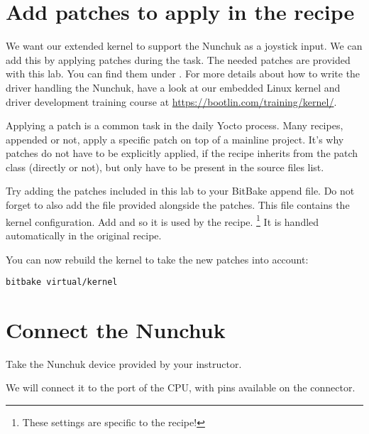 \section{Add patches to apply in the recipe}

We want our extended
{{}}
kernel to support the Nunchuk as
a joystick input. We can add this by applying patches during the
 task. The needed patches are provided with this lab. You can
find them under . For more
details about how to write the driver handling the Nunchuk, have a look at our
embedded Linux kernel and driver development training course at
\url{https://bootlin.com/training/kernel/}.

Applying a patch is a common task in the daily Yocto process. Many recipes,
appended or not, apply a specific patch on top of a mainline project. It's why
patches do not have to be explicitly applied, if the recipe inherits from the
patch class (directly or not), but only have to be present in the source files
list.

Try adding the patches included in this lab to your BitBake append
file. Do not forget to also add the  file provided
alongside the patches. This file contains the kernel configuration.
\if{}
Add  and  so it is used by the  recipe.
\footnote{These settings are specific to the  recipe!}
\else
It is handled automatically in the
  original recipe.
\fi

You can now rebuild the kernel to take the new patches into account:
\begin{verbatim}
bitbake virtual/kernel
\end{verbatim}

\section{Connect the Nunchuk}

Take the Nunchuk device provided by your instructor.

We will connect it to the  port
of the CPU, with pins available on the  connector.

